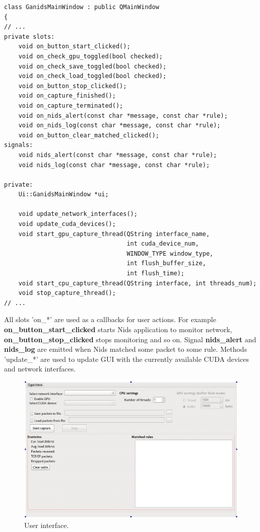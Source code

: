 \documentclass[thesis=M,english]{FITthesis}[2011/07/15]
\begin{document}
\begin{lstlisting}
class GanidsMainWindow : public QMainWindow
{
// ...    
private slots:
    void on_button_start_clicked();
    void on_check_gpu_toggled(bool checked);
    void on_check_save_toggled(bool checked);
    void on_check_load_toggled(bool checked);
    void on_button_stop_clicked();
    void on_capture_finished();
    void on_capture_terminated();
    void on_nids_alert(const char *message, const char *rule);
    void on_nids_log(const char *message, const char *rule);
    void on_button_clear_matched_clicked();
signals:
    void nids_alert(const char *message, const char *rule);
    void nids_log(const char *message, const char *rule);

private:
    Ui::GanidsMainWindow *ui;

    void update_network_interfaces();
    void update_cuda_devices();
    void start_gpu_capture_thread(QString interface_name,
                                  int cuda_device_num,
                                  WINDOW_TYPE window_type,
                                  int flush_buffer_size,
                                  int flush_time);
    void start_cpu_capture_thread(QString interface, int threads_num);
    void stop_capture_thread();
// ...
\end{lstlisting}

All slots 'on\_*' are used as a callbacks for user actions. For example \textbf{on\_button\_start\_clicked} starts Nids application to monitor network, \textbf{on\_button\_stop\_clicked} stops monitoring and so on. Signal \textbf{nids\_alert} and \textbf{nids\_log} are emitted when Nids matched some packet to some rule. Methods 'update\_*' are used to update GUI with the currently available CUDA devices and network interfaces.

\begin{figure}[h]
\centering
\includegraphics[scale=0.3]{images/user_interface.png}
\caption{User interface.}
\label{fig:user_interface}
\end{figure}
\end{document}
